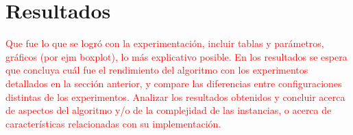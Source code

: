 \section{Resultados}

\textcolor{red}{Que fue lo que se logró con la experimentación, incluir tablas y parámetros, gráficos (por ejm boxplot), lo más explicativo posible. En los resultados se espera que concluya cuál fue el rendimiento del algoritmo con los experimentos detallados en la sección anterior, y compare las diferencias entre configuraciones distintas de los experimentos. Analizar los resultados obtenidos y concluir acerca de aspectos del algoritmo y/o de la complejidad de las instancias, o acerca de características relacionadas con su implementación.}
